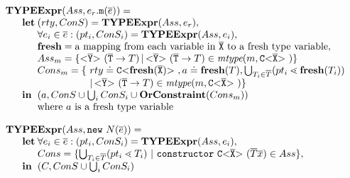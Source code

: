 \documentclass[runningheads]{llncs}
\begin{document}
\smallskip

$\begin{array}{@{}l@{}l@{}l}
\textbf{TY}& \textbf{PE} & \textbf{Expr} (Ass, e_r.\mathtt{m}(\overline{e}) ) = \\
& \textbf{let} %
& (rty, ConS) = \textbf{TYPEExpr}(Ass, e_r),\\
& & \forall e_i \in \overline{e} : (pt_i, ConS_i) = \textbf{TYPEExpr}(Ass, e_i)  ,\\
& & \textbf{fresh} = \text{a mapping from each variable in}\ \ol{X} \ \text{to a fresh type variable},\\
& & Ass_{m} =  \set{\exptype{}{\ol{Y}} (\ol{T} \to T) \,|\, \exptype{}{\ol{Y}} (\ol{T} \to T) \in \textit{mtype}(m, \exptype{C}{\ol{X}})} \\
& & \begin{array}{@{}l@{}l}
        Cons_{m} = \{\ & rty \doteq \exptype{C}{\textbf{fresh}(\ol{X})}, a \doteq \textbf{fresh}(T), \bigcup_{T_i \in \overline{T}} (pt_i \lessdot \textbf{fresh}(T_i))\\
                    & |\, \exptype{}{\ol{Y}} (\ol{T} \to T) \in \textit{mtype}(m, \exptype{C}{\ol{X}}) \} %
    \end{array}\\
& \mathbf{in}%
& (a, ConS \cup \bigcup_i ConS_i \cup \textbf{OrConstraint}(Cons_{m}))\\
& & \text{where\ } a \text{\ is\ a\ fresh\
  type\ variable}\\ 
\end{array}
$

\smallskip

$\begin{array}{@{}l@{}l@{}l}
\textbf{TY}& \textbf{PE} & \textbf{Expr} (Ass, \mathtt{new }\ N(\overline{e}) ) = \\
& \textbf{let} %
& \forall e_i \in \overline{e} : (pt_i, ConS_i) = \textbf{TYPEExpr}(Ass, e_i)  ,\\
& & Cons = \{ \bigcup_{T_i \in \overline{T}} (pt_i \lessdot T_i) \ | \ \mathtt{constructor }\ \exptype{C}{\ol{X}}(\overline{T} \overline{x}) \in Ass \},\\
& \mathbf{in}%
& (C, ConS \cup \bigcup_i ConS_i)\\
\end{array}
$
\end{document}
